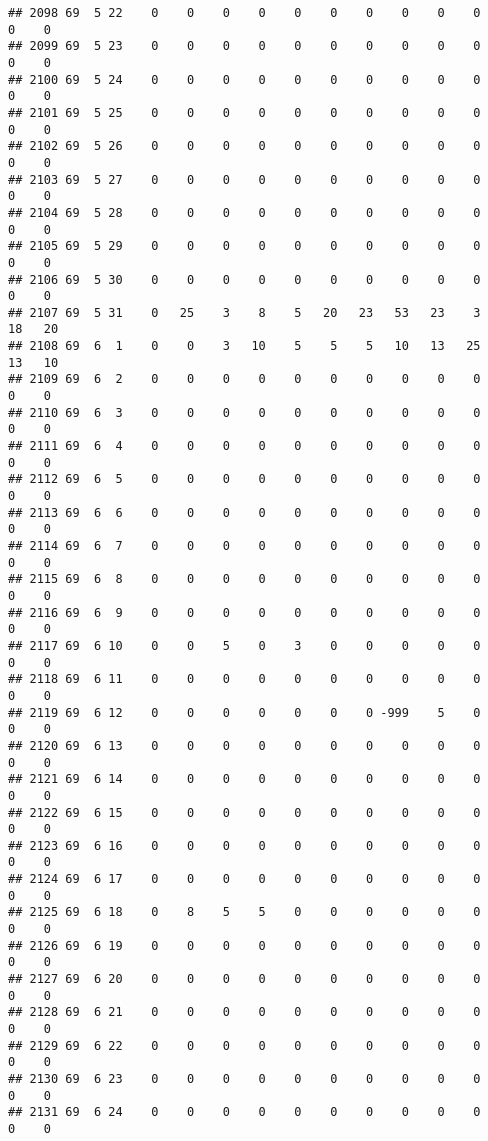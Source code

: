 \documentclass[]{article}
\begin{document}
\begin{verbatim}
## 2098 69  5 22    0    0    0    0    0    0    0    0    0    0    0    0
## 2099 69  5 23    0    0    0    0    0    0    0    0    0    0    0    0
## 2100 69  5 24    0    0    0    0    0    0    0    0    0    0    0    0
## 2101 69  5 25    0    0    0    0    0    0    0    0    0    0    0    0
## 2102 69  5 26    0    0    0    0    0    0    0    0    0    0    0    0
## 2103 69  5 27    0    0    0    0    0    0    0    0    0    0    0    0
## 2104 69  5 28    0    0    0    0    0    0    0    0    0    0    0    0
## 2105 69  5 29    0    0    0    0    0    0    0    0    0    0    0    0
## 2106 69  5 30    0    0    0    0    0    0    0    0    0    0    0    0
## 2107 69  5 31    0   25    3    8    5   20   23   53   23    3   18   20
## 2108 69  6  1    0    0    3   10    5    5    5   10   13   25   13   10
## 2109 69  6  2    0    0    0    0    0    0    0    0    0    0    0    0
## 2110 69  6  3    0    0    0    0    0    0    0    0    0    0    0    0
## 2111 69  6  4    0    0    0    0    0    0    0    0    0    0    0    0
## 2112 69  6  5    0    0    0    0    0    0    0    0    0    0    0    0
## 2113 69  6  6    0    0    0    0    0    0    0    0    0    0    0    0
## 2114 69  6  7    0    0    0    0    0    0    0    0    0    0    0    0
## 2115 69  6  8    0    0    0    0    0    0    0    0    0    0    0    0
## 2116 69  6  9    0    0    0    0    0    0    0    0    0    0    0    0
## 2117 69  6 10    0    0    5    0    3    0    0    0    0    0    0    0
## 2118 69  6 11    0    0    0    0    0    0    0    0    0    0    0    0
## 2119 69  6 12    0    0    0    0    0    0    0 -999    5    0    0    0
## 2120 69  6 13    0    0    0    0    0    0    0    0    0    0    0    0
## 2121 69  6 14    0    0    0    0    0    0    0    0    0    0    0    0
## 2122 69  6 15    0    0    0    0    0    0    0    0    0    0    0    0
## 2123 69  6 16    0    0    0    0    0    0    0    0    0    0    0    0
## 2124 69  6 17    0    0    0    0    0    0    0    0    0    0    0    0
## 2125 69  6 18    0    8    5    5    0    0    0    0    0    0    0    0
## 2126 69  6 19    0    0    0    0    0    0    0    0    0    0    0    0
## 2127 69  6 20    0    0    0    0    0    0    0    0    0    0    0    0
## 2128 69  6 21    0    0    0    0    0    0    0    0    0    0    0    0
## 2129 69  6 22    0    0    0    0    0    0    0    0    0    0    0    0
## 2130 69  6 23    0    0    0    0    0    0    0    0    0    0    0    0
## 2131 69  6 24    0    0    0    0    0    0    0    0    0    0    0    0

\end{verbatim}
\end{document}
